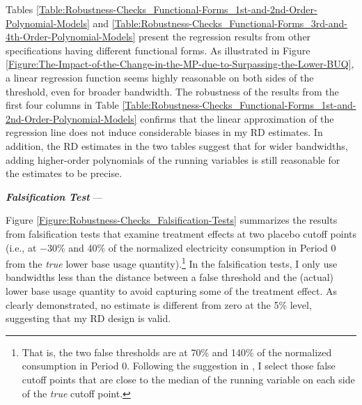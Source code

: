 Tables \ref{Table:Robustness-Checks_Functional-Forms_1st-and-2nd-Order-Polynomial-Models} and \ref{Table:Robustness-Checks_Functional-Forms_3rd-and-4th-Order-Polynomial-Models} present the regression results from other specifications having different functional forms. As illustrated in Figure \ref{Figure:The-Impact-of-the-Change-in-the-MP-due-to-Surpassing-the-Lower-BUQ}, a linear regression function seems highly reasonable on both sides of the threshold, even for broader bandwidth. The robustness of the results from the first four columns in Table \ref{Table:Robustness-Checks_Functional-Forms_1st-and-2nd-Order-Polynomial-Models} confirms that the linear approximation of the regression line does not induce considerable biases in my RD estimates. In addition, the RD estimates in the two tables suggest that for wider bandwidths, adding higher-order polynomials of the running variables is still reasonable for the estimates to be precise.


\par \vspace{0.5cm}
\noindent
\textit{\textbf{Falsification Test}} ---

Figure \ref{Figure:Robustness-Checks_Falsification-Tests} summarizes the results from falsification tests that examine treatment effects at two placebo cutoff points (i.e., at $-$30\% and 40\% of the normalized electricity consumption in Period 0 from the \textit{true} lower base usage quantity).\footnote{That is, the two false thresholds are at 70\% and 140\% of the normalized consumption in Period 0. Following the suggestion in \cite{Regression-Discontinuity-Designs_A-Guide-to-Practice_Imbens-and-Lemieux_2008}, I select those false cutoff points that are close to the median of the running variable on each side of the \textit{true} cutoff point.} In the falsification tests, I only use bandwidths less than the distance between a false threshold and the (actual) lower base usage quantity to avoid capturing some of the treatment effect. As clearly demonstrated, no estimate is different from zero at the 5\% level, suggesting that my RD design is valid. 
